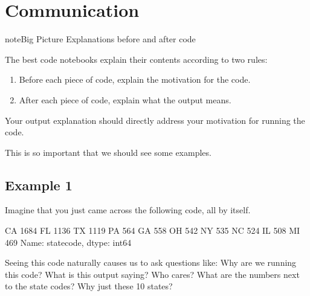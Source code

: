 \documentclass[letterpaper,10pt,english]{sphinxmanual}
\begin{document}
\section{Communication}
\label{\detokenize{chapter-5-before-and-after:communication}}
\begin{sphinxadmonition}{note}{Big Picture \sphinxhyphen{} Explanations before and after code}

The best code notebooks explain their contents according to two rules:
\begin{enumerate}
%
\item {} 
Before each piece of code, explain the motivation for the code.

\item {} 
After each piece of code, explain what the output means.

\end{enumerate}

 Your output explanation should directly address your motivation for running the code.
\end{sphinxadmonition}

This is so important that we should see some examples.


\subsection{Example 1}
\label{\detokenize{chapter-5-before-and-after:example-1}}
Imagine that you just came across the following code, all by itself.

\begin{sphinxVerbatim}[commandchars=\\\{\}]
\PYG{p}{[}\PYG{p}{]}  
\end{sphinxVerbatim}

\begin{sphinxVerbatim}[commandchars=\\\{\}]
CA    1684
FL    1136
TX    1119
PA     564
GA     558
OH     542
NY     535
NC     524
IL     508
MI     469
Name: state\PYGZus{}code, dtype: int64
\end{sphinxVerbatim}

Seeing this code naturally causes us to ask questions like:  Why are we running this code?  What is this output saying?  Who cares?  What are the numbers next to the state codes?  Why just these 10 states?
\end{document}
